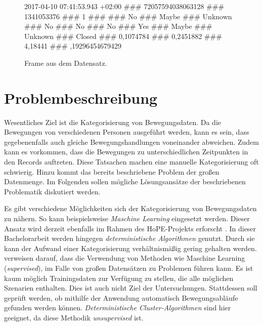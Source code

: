 \begin{center}
  \begin{figure}[ht]
    2017-04-10 07:41:53.943 +02:00 \#\#\# 72057594038063128 \#\#\# 1341053376 \#\#\# 1 \#\#\#
     \#\#\# No \#\#\# Maybe \#\#\# Unknown \#\#\# No \#\#\# No \#\#\# No \#\#\# Yes \#\#\#
    \newline Maybe \#\#\# Unknown \#\#\# Closed \#\#\# 0,1074784 \#\#\# 0,2451882 \#\#\# 4,18441 \#\#\#
    ,19296454679429
    \caption{Frame aus dem Datensatz.}
    \label{fig:FrameExample}
  \end{figure}
\end{center}

\clearpage
\section{Problembeschreibung}
\label{2-Problembeschreibung}
Wesentliches Ziel ist die Kategorisierung von Bewegungsdaten.
Da die Bewegungen von verschiedenen Personen ausgeführt werden,
kann es sein, dass gegebenenfalls auch gleiche Bewegungshandlungen voneinander abweichen.
Zudem kann es vorkommen, dass die Bewegungen zu unterschiedlichen Zeitpunkten in den Records auftreten.
Diese Tatsachen machen eine manuelle Kategorisierung oft schwierig.
Hinzu kommt das bereits beschriebene Problem der großen Datenmenge.
Im Folgenden sollen mögliche Lösungsansätze der beschriebenen Problematik diskutiert werden.

Es gibt verschiedene Möglichkeiten sich der Kategorisierung von Bewegungsdaten zu nähern.
So kann beispielsweise \emph{Maschine Learning} eingesetzt werden.
Dieser Ansatz wird derzeit ebenfalls im Rahmen des HoPE-Projekts erforscht \citep{plischke_master_2022}.
In dieser Bachelorarbeit werden hingegen \emph{deterministische Algorithmen} genutzt.
Durch sie kann der Aufwand einer Kategorisierung verhältnismäßig gering gehalten werden.
\citet{aghabozorgi_time-series_2015} verweisen darauf, dass die Verwendung von Methoden
wie Maschine Learning (\emph{supervised}), im Falle von großen Datensätzen zu Problemen führen kann.
Es ist kaum möglich Trainingsdaten zur Verfügung zu stellen, die alle möglichen Szenarien enthalten.
Dies ist auch nicht Ziel der Untersuchungen.
Stattdessen soll geprüft werden,
ob mithilfe der Anwendung automatisch Bewegungsabläufe gefunden werden können.
\emph{Deterministische Cluster-Algorithmen} sind hier geeignet,
da diese Methodik \emph{unsupervised} ist.

